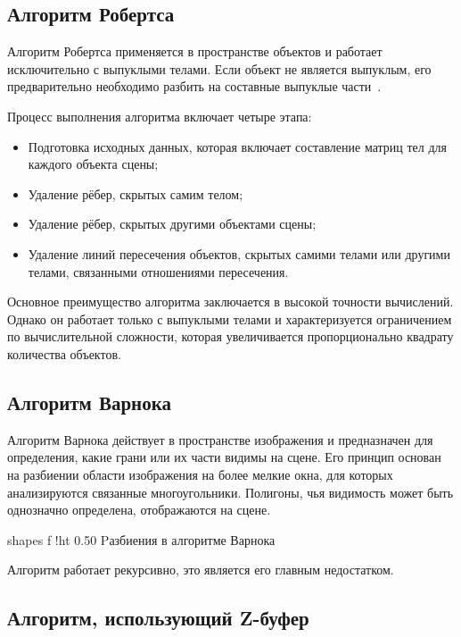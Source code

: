 \subsection{Алгоритм Робертса}

Алгоритм Робертса применяется в пространстве объектов и работает исключительно с выпуклыми телами.  
Если объект не является выпуклым, его предварительно необходимо разбить на составные выпуклые части~\cite{ROB}.  

Процесс выполнения алгоритма включает четыре этапа:  
\begin{itemize}[label*=---]  
    \item Подготовка исходных данных, которая включает составление матриц тел для каждого объекта сцены;  
    \item Удаление рёбер, скрытых самим телом;  
    \item Удаление рёбер, скрытых другими объектами сцены;  
    \item Удаление линий пересечения объектов, скрытых самими телами или другими телами, связанными отношениями пересечения.  
\end{itemize}  

Основное преимущество алгоритма заключается в высокой точности вычислений.  
Однако он работает только с выпуклыми телами и характеризуется ограничением по вычислительной сложности, которая увеличивается пропорционально квадрату количества объектов.  

\subsection{Алгоритм Варнока}  

Алгоритм Варнока действует в пространстве изображения и предназначен для определения, какие грани или их части видимы на сцене.  
Его принцип основан на разбиении области изображения на более мелкие окна, для которых анализируются связанные многоугольники.  
Полигоны, чья видимость может быть однозначно определена, отображаются на сцене.  

    {shapes}
    {f}
    {!ht}
    {0.50\textwidth}
    {Pазбиения в алгоритме Варнока}


Алгоритм работает рекурсивно, это является его главным недостатком.


\subsection{Алгоритм, использующий Z-буфер}

